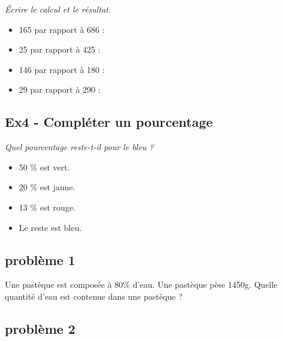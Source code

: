 \textit{Écrire le calcul et le résultat.}
  
\begin{multicols}{2}
  \begin{itemize}[label={$\bullet$}]
    \item 165 par rapport à 686 : \dotfill \\ \Pointilles[1]
    \item  25 par rapport à 425 : \dotfill \\ \Pointilles[1] \columnbreak 
    \item 146 par rapport à 180 : \dotfill \\ \Pointilles[1]
    \item  29 par rapport à 290 : \dotfill \\ \Pointilles[1]
  \end{itemize} 
\end{multicols}

\subsection*{Ex4 - Compléter un pourcentage}

\textit{Quel pourcentage reste-t-il pour le bleu ?}

\begin{multicols}{2}
\begin{itemize}[label={$\bullet$}]
  \item 50 \% est vert.
  \item 20 \% est jaune.
  \item 13 \% est rouge.
  \item Le reste est bleu. 
\end{itemize} \columnbreak 
\Pointilles[6]
\end{multicols}

\newpage

\subsection*{problème 1}

Une pastèque est composée à 80\% d'eau. Une pastèque pèse 1450g. Quelle quantité d'eau est contenue dans une pastèque ? \\

\Pointilles[4]

\subsection*{problème 2}

